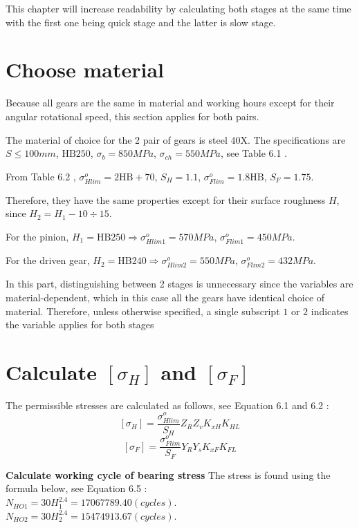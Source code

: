 This chapter will increase readability by calculating both stages at the same time with the first one being quick stage and the latter is slow stage.
\section{Choose material}
Because all gears are the same in material and working hours except for their angular rotational speed, this section applies for both pairs.

The material of choice for the 2 pair of gears is steel 40X. The specifications are $ S\leq100\unit{mm} $, $ \text{HB} 250 $, $ \sigma_b = 850\unit{MPa} $, $ \sigma_{ch} = 550 \unit{MPa}$, see Table 6.1  \cite{tk1}.

From Table 6.2 \cite{tk1}, $ \sigma_{Hlim}^o = 2\text{HB} + 70$, $ S_H = 1.1 $, $ \sigma_{Flim}^o = 1.8\text{HB} $, $ S_F = 1.75 $.

Therefore, they have the same properties except for their surface roughness $ H $, since $ H_2 = H_1 - 10 \div 15$.

For the pinion, $ H_1=\text{HB}250 \Rightarrow \sigma_{Hlim1}^o = 570\unit{MPa}$, $ \sigma_{Flim1}^o = 450\unit{MPa}$.

For the driven gear, $ H_2=\text{HB}240 \Rightarrow \sigma_{Hlim2}^o = 550\unit{MPa}$, $ \sigma_{Flim2}^o = 432\unit{MPa}$.

In this part, distinguishing between 2 stages is unnecessary since the variables are material-dependent, which in this case all the gears have identical choice of material. Therefore, unless otherwise specified, a single subscript $ 1 $ or $ 2 $ indicates the variable applies for both stages

\section{Calculate $ [\sigma_H] $ and $ [\sigma_F] $}
The permissible stresses are calculated as follows, see Equation 6.1 and 6.2 \cite{tk1}:
\[[\sigma_{H}]=\dfrac{\sigma_{Hlim}^o}{S_H}Z_RZ_vK_{xH}K_{HL}\]
\[[\sigma_{F}]=\dfrac{\sigma_{Flim}^o}{S_F}Y_RY_sK_{xF}K_{FL}\]

\textbf{Calculate working cycle of bearing stress} The stress is found using the formula below, see Equation 6.5 \cite{tk1}:\\
$ N_{HO1} = 30H_1^{2.4} = 17067789.40\unit{(cycles)}$.\\
$ N_{HO2} = 30H_2^{2.4} = 15474913.67\unit{(cycles)}$.\\

